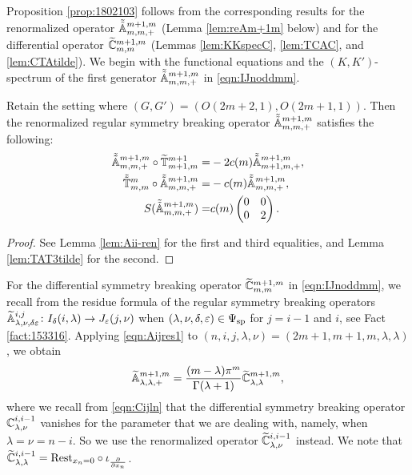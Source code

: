 Proposition \ref{prop:1802103} follows from the corresponding results
 for the renormalized operator $\tilde{\tilde{{\mathbb{A}}}}_{{m},{m},{+}}^{{m+1,m}}$
 (Lemma \ref{lem:reAm+1m} below)
 and for the differential operator $\widetilde{{\mathbb{C}}}_{{m},{m}}^{{m+1,m}}$
 (Lemmas \ref{lem:KKspecC}, \ref{lem:TCAC}, and \ref{lem:CTAtilde}).  
We begin with the functional equations
 and the $(K,K')$-spectrum
 of the first generator 
 $\tilde{\tilde{{\mathbb{A}}}}_{{m},{m},{+}}^{{m+1,m}}$ in \eqref{eqn:IJnoddmm}.  
\begin{lemma}
\label{lem:reAm+1m}
Retain the setting 
 where $(G,G')=(O(2m+2,1),O(2m+1,1))$.  
Then the renormalized regular symmetry breaking operator
 $\tilde{\tilde{{\mathbb{A}}}}_{{m},{m},{+}}^{{m+1,m}}$ satisfies the following:
\begin{align*}
 \tilde{\tilde{{\mathbb{A}}}}_{{m},{m},{+}}^{{m+1,m}} \circ \widetilde{{\mathbb{T}}}_{{m+1},{m}}^{{m+1}} 
  =& -2 c(m) \tilde{\tilde{{\mathbb{A}}}}_{{m+1},{m},{+}}^{{m+1,m}}, 
\\
 \tilde{\tilde{{\mathbb{T}}}}_{{m},{m}}^{{m}}  \circ \tilde{\tilde{{\mathbb{A}}}}_{{m},{m},{+}}^{{m+1,m}}
 =& -c(m) \tilde{\tilde{{\mathbb{A}}}}_{{m},{m},{+}}^{{m+1,m}}, 
\\
 S(\tilde{\tilde{{\mathbb{A}}}}_{{m},{m},{+}}^{{m+1,m}})=& c(m) \begin{pmatrix} 0 & 0 \\ 0 & 2 \end{pmatrix}.  
\end{align*}
\end{lemma}

\begin{proof}
See Lemma \ref{lem:Aii-ren} for the first and third equalities, 
 and Lemma \ref{lem:TAT3tilde} for the second.  
\end{proof}



For the differential symmetry breaking operator
 $\widetilde{{\mathbb{C}}}_{{m},{m}}^{{m+1,m}}$ in \eqref{eqn:IJnoddmm},
 we recall from \cite[Thm.~1.3]{xkresidue}
 the 
 residue formula of the regular symmetry breaking operators
 ${\widetilde{\mathbb{A}}}_{{\lambda},{\nu},{\delta \varepsilon}}^{{i,j}}
 \colon I_{\delta}(i,\lambda) \to J_{\varepsilon}(j,\nu)$
 when 
$(\lambda, \nu,\delta, \varepsilon) \in \Psi_{{\operatorname{sp}}}$
 for $j=i-1$ and $i$, 
 see Fact \ref{fact:153316}.  
Applying \eqref{eqn:Aijres1} to 
 $(n, i,j,\lambda,\nu)=(2m+1,m+1,m,\lambda,\lambda)$, 
 we obtain 
\begin{equation}
\label{eqn:resAC2}
{\widetilde{\mathbb{A}}}_{{\lambda},{\lambda},{+}}^{{m+1,m}}
=
\frac{(m-\lambda) \pi^{m}}{\Gamma(\lambda+1)}\widetilde{{\mathbb{C}}}_{{\lambda},{\lambda}}^{{m+1,m}}, 
\end{equation}
where we recall from \eqref{eqn:Cijln}
 that the differential symmetry breaking operator
 ${\mathbb{C}}_{{\lambda},{\nu}}^{{i,i-1}}$ vanishes
 for the parameter
 that we are dealing with, 
 namely,
 when $\lambda=\nu=n-i$.  
So we use the renormalized operator 
 $\widetilde{{\mathbb{C}}}_{{\lambda},{\nu}}^{{i,i-1}}$ instead.  
We note that 
$
   \widetilde{{\mathbb{C}}}_{{\lambda},{\lambda}}^{{i,i-1}}
  ={\operatorname{Rest}}_{x_n=0}\circ \iota_{\frac\partial{\partial x_n}}
$.  



